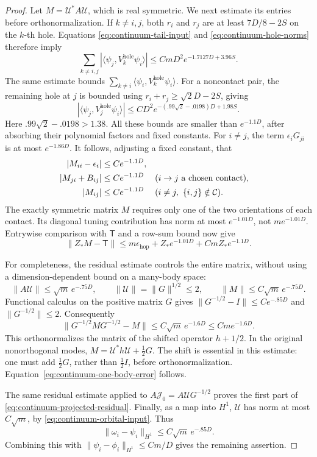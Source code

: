\begin{proof}
Let \(M=\mathcal U^*A\mathcal U\), which is real symmetric.
We next estimate its entries before orthonormalization.
If \(k\ne i,j\), both \(r_i\) and \(r_j\) are at least
\(7D/8-2S\) on the \(k\)-th hole.  Equations
\eqref{eq:continuum-tail-input} and
\eqref{eq:continuum-hole-norms} therefore imply
\[
 \sum_{k\ne i,j}
 |\langle\psi_j,V_k^{\mathrm{hole}}\psi_i\rangle|
 \le CmD^2e^{-1.7127D+3.96S}.
\]
The same estimate bounds
\(\sum_{k\ne i}\langle\psi_i,V_k^{\mathrm{hole}}\psi_i\rangle\).
For a noncontact pair, the remaining hole at \(j\) is bounded using
\(r_i+r_j\ge\sqrt2D-2S\), giving
\[
 |\langle\psi_j,V_j^{\mathrm{hole}}\psi_i\rangle|
 \le CD^2
 e^{-(.99\sqrt2-.0198)D+1.98S}.
\]
Here \(.99\sqrt2-.0198>1.38\).
All these bounds are smaller than \(e^{-1.1D}\), after
absorbing their polynomial factors and fixed constants.
For \(i\ne j\), the term \(\epsilon_iG_{ji}\) is at most
\(e^{-1.86D}\).  It follows, adjusting a fixed constant, that
\begin{align}
 |M_{ii}-\epsilon_i|&\le Ce^{-1.1D},\notag\\
 |M_{ji}+B_{ij}|&\le Ce^{-1.1D}
       &&(i\to j\text{ a chosen contact}),\label{eq:continuum-raw-entries}\\
 |M_{ij}|&\le Ce^{-1.1D}
       &&(i\ne j,\ \{i,j\}\notin\mathcal C).\notag
\end{align}
The exactly symmetric matrix \(M\) requires only one of the two
orientations of each contact.  Its diagonal tuning contribution
has norm at most \(e^{-1.01D}\), not \(m e^{-1.01D}\).
Entrywise comparison with \(\mathsf T\) and a row-sum bound now give
\[
 \|Z_*M-\mathsf T\|
 \le m\epsilon_{\mathrm{hop}}
     +Z_*e^{-1.01D}+CmZ_*e^{-1.1D}.
\]

For completeness, the residual estimate controls the entire matrix,
without using a dimension-dependent bound on a many-body space:
\[
 \|A\mathcal U\|\le\sqrt m\,e^{-.75D},\qquad
 \|\mathcal U\|=\|G\|^{1/2}\le2,\qquad
 \|M\|\le C\sqrt m\,e^{-.75D}.
\]
Functional calculus on the positive matrix \(G\) gives
\(\|G^{-1/2}-I\|\le Ce^{-.85D}\) and
\(\|G^{-1/2}\|\le2\).  Consequently
\begin{equation}
 \|G^{-1/2}MG^{-1/2}-M\|
 \le C\sqrt m\,e^{-1.6D}
 \le Cm e^{-1.6D}.
 \label{eq:continuum-gram-correction}
\end{equation}
This orthonormalizes the matrix of the shifted operator
\(h+1/2\).  In the original nonorthogonal modes,
\(M=\mathcal U^*h\mathcal U+\tfrac12G\).
The shift is essential in this estimate: one must add
\(\tfrac12G\), rather than \(\tfrac12I\), before
orthonormalization.
Equation~\eqref{eq:continuum-one-body-error} follows.

The same residual estimate applied to
\(A\mathcal J_0=A\mathcal U G^{-1/2}\) proves the first part of
\eqref{eq:continuum-projected-residual}.
Finally, as a map into \(H^1\), \(\mathcal U\) has norm at most
\(C\sqrt m\), by \eqref{eq:continuum-orbital-input}.  Thus
\[
 \|\omega_i-\psi_i\|_{H^1}
 \le C\sqrt m\,e^{-.85D}.
\]
Combining this with \(\|\psi_i-\phi_i\|_{H^1}\le Cm/D\)
gives the remaining assertion.
\end{proof}

